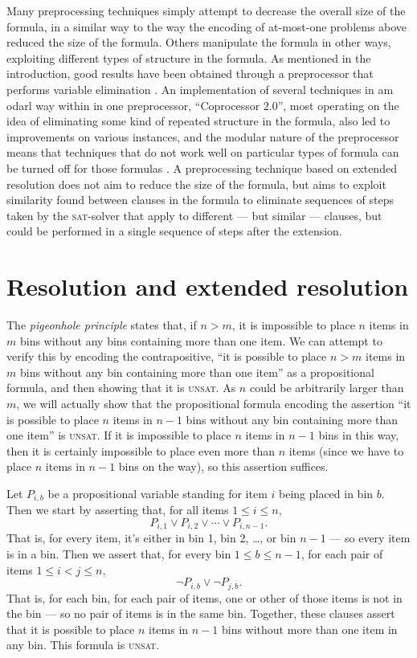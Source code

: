 \documentclass[proof,pdftex,11pt,a4,titlepage]{article}
\newcommand{\sat}{\textsc{sat}}
\newcommand{\unsat}{\textsc{unsat}}
\begin{document}
Many preprocessing techniques simply attempt to decrease the overall size of the formula, in a similar way to the way the encoding of at-most-one problems above reduced the size of the formula. Others manipulate the formula in other ways, exploiting different types of structure in the formula. As mentioned in the introduction, good results have been obtained through a preprocessor that performs variable elimination \cite{Een:2005}. An implementation of several techniques in am odarl way within in one preprocessor, ``Coprocessor 2.0'', most operating on the idea of eliminating some kind of repeated structure in the formula, also led to improvements on various instances, and the modular nature of the preprocessor means that techniques that do not work well on particular types of formula can be turned off for those formulas \cite{Manthey:2012}. A preprocessing technique based on extended resolution does not aim to reduce the size of the formula, but aims to exploit similarity found between clauses in the formula to eliminate sequences of steps taken by the \sat{}-solver that apply to different --- but similar --- clauses, but could be performed in a single sequence of steps after the extension.

\section{Resolution and extended resolution}
\label{sec:resolution}

The \emph{pigeonhole principle} states that, if $n > m$, it is impossible to place $n$ items in $m$ bins without any bins containing more than one item. We can attempt to verify this by encoding the contrapositive, ``it is possible to place $n>m$ items in $m$ bins without any bin containing more than one item'' as a propositional formula, and then showing that it is \unsat. As $n$ could be arbitrarily larger than $m$, we will actually show that the propositional formula encoding the assertion ``it is possible to place $n$ items in $n-1$ bins without any bin containing more than one item'' is \unsat. If it is impossible to place $n$ items in $n-1$ bins in this way, then it is certainly impossible to place even more than $n$ items (since we have to place $n$ items in $n-1$ bins on the way), so this assertion suffices.

Let $P_{i,b}$ be a propositional variable standing for item $i$ being placed in bin $b$. Then we start by asserting that, for all items $1 \leq i \leq n$,
\[P_{i,1} \vee P_{i,2} \vee \cdots \vee P_{i,n-1}.\]
That is, for every item, it's either in bin 1, bin 2, \dots, or bin $n-1$ --- so every item is in a bin. Then we assert that, for every bin $1 \leq b \leq n-1$, for each pair of items $1 \leq i < j \leq n$,
\[\neg P_{i,b} \vee \neg P_{j,b}.\]
That is, for each bin, for each pair of items, one or other of those items is not in the bin --- so no pair of items is in the same bin. Together, these clauses assert that it is possible to place $n$ items in $n-1$ bins without more than one item in any bin. This formula is \unsat.
\end{document}
